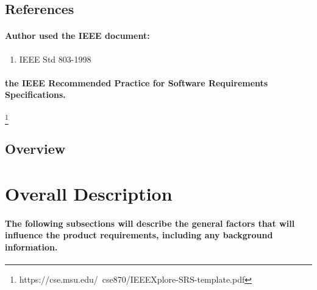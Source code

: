 \subsection{References}
%
\paragraph{Author used the IEEE document:}
\begin{enumerate}
\item IEEE Std 803-1998
\end{enumerate}
\paragraph{the IEEE Recommended Practice for Software Requirements Specifications.}\footnote{https://cse.msu.edu/~cse870/IEEEXplore-SRS-template.pdf}

\subsection{Overview}

\section{Overall Description}
\paragraph{The following subsections will describe the general factors that will influence the product requirements, including any background information.}
 
